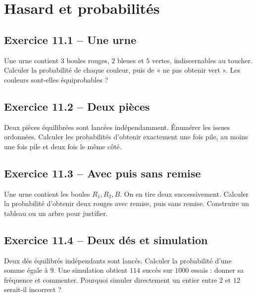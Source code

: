 \chapter{Hasard et probabilités}
\label{exercices:11}
\section*{Exercice 11.1 -- Une urne}
Une urne contient $3$ boules rouges, $2$ bleues et $5$ vertes, indiscernables au toucher. Calculer la probabilité de chaque couleur, puis de « ne pas obtenir vert ». Les couleurs sont-elles équiprobables ?

\section*{Exercice 11.2 -- Deux pièces}
Deux pièces équilibrées sont lancées indépendamment. Énumérer les issues ordonnées. Calculer les probabilités d'obtenir exactement une fois pile, au moins une fois pile et deux fois le même côté.

\section*{Exercice 11.3 -- Avec puis sans remise}
Une urne contient les boules $R_1,R_2,B$. On en tire deux successivement. Calculer la probabilité d'obtenir deux rouges avec remise, puis sans remise. Construire un tableau ou un arbre pour justifier.

\section*{Exercice 11.4 -- Deux dés et simulation}
Deux dés équilibrés indépendants sont lancés. Calculer la probabilité d'une somme égale à $9$. Une simulation obtient $114$ succès sur $1000$ essais : donner sa fréquence et commenter. Pourquoi simuler directement un entier entre $2$ et $12$ serait-il incorrect ?
